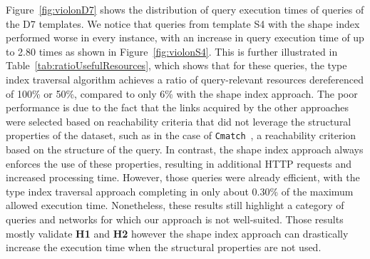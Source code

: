Figure~\ref{fig:violonD7} shows the distribution of query execution times of queries of the D7 templates.
We notice that queries from template S4 with the shape index performed worse in every instance, with an increase in query execution time of up to 2.80 times as shown in Figure~\ref{fig:violonS4}.
This is further illustrated in Table~\ref{tab:ratioUsefulResources}, which shows that for these queries, the type index traversal algorithm achieves a ratio of query-relevant resources dereferenced of 100\% or 50\%, compared to only 6\% with the shape index approach.
The poor performance is due to the fact that the links acquired by the other approaches were selected based on reachability criteria that did not leverage the structural properties of the dataset, such as in the case of \texttt{Cmatch}~\cite{hartig2016walking}, a reachability criterion based on the structure of the query.
In contrast, the shape index approach always enforces the use of these properties, resulting in additional \ac{HTTP} requests and increased processing time.
However, those queries were already efficient, with the type index traversal approach completing in only about 0.30\% of the maximum allowed execution time.
Nonetheless, these results still highlight a category of queries and networks for which our approach is not well-suited.
Those results mostly validate \textbf{H1} and \textbf{H2} however the shape index approach can drastically increase the execution time when the structural properties are not used.



